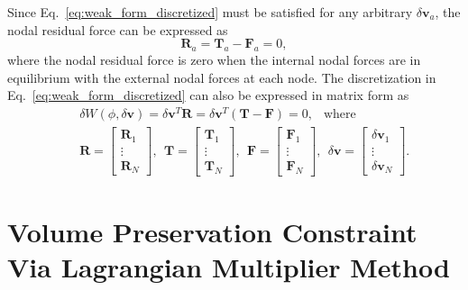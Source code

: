 Since Eq.\ \eqref{eq:weak_form_discretized} must be satisfied for any arbitrary $\delta \pmb{v}_a$, the nodal residual force can be expressed as
%
\begin{equation}
\pmb{R}_a = \pmb{T}_a - \pmb{F}_a = 0,
\end{equation}
%
where the nodal residual force is zero when the internal nodal forces are in equilibrium with the external nodal forces at each node. The discretization in Eq.\ \eqref{eq:weak_form_discretized} can also be expressed in matrix form as
%
\begin{eqnarray}
&&\delta W(\phi,\delta\pmb{v}) = \delta \textbf{v}^T \textbf{R} = \delta \textbf{v}^T (\textbf{T} - \textbf{F})=0, \ \ \text{ where } \nonumber\\
%
&& \textbf{R} = \begin{bmatrix}
\pmb{R}_1 \\ \vdots \\ \pmb{R}_N
\end{bmatrix}, \ \
%
\textbf{T} = \begin{bmatrix}
\pmb{T}_1 \\ \vdots \\ \pmb{T}_N
\end{bmatrix}, \ \
%
\textbf{F} = \begin{bmatrix}
\pmb{F}_1 \\ \vdots \\ \pmb{F}_N
\end{bmatrix}, \ \
%
\delta\textbf{v} = \begin{bmatrix}
\delta\pmb{v}_1 \\ \vdots \\ \delta\pmb{v}_N
\end{bmatrix}.
\end{eqnarray}
%

\section{Volume Preservation Constraint Via Lagrangian Multiplier Method}


